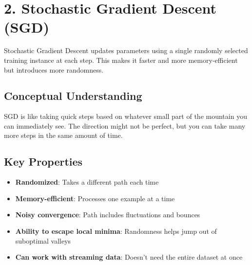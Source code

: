 \documentclass[
  letterpaper,
  DIV=11,
  numbers=noendperiod]{scrreprt}
\providecommand{\tightlist}{%
  \setlength{\itemsep}{0pt}\setlength{\parskip}{0pt}}\usepackage{longtable,booktabs,array}
\begin{document}
\section{2. Stochastic Gradient Descent
(SGD)}\label{stochastic-gradient-descent-sgd}

Stochastic Gradient Descent updates parameters using a single randomly
selected training instance at each step. This makes it faster and more
memory-efficient but introduces more randomness.

\subsection{Conceptual Understanding}\label{conceptual-understanding-2}

SGD is like taking quick steps based on whatever small part of the
mountain you can immediately see. The direction might not be perfect,
but you can take many more steps in the same amount of time.

\subsection{Key Properties}\label{key-properties-1}

\begin{itemize}
\tightlist
\item
  \textbf{Randomized}: Takes a different path each time
\item
  \textbf{Memory-efficient}: Processes one example at a time
\item
  \textbf{Noisy convergence}: Path includes fluctuations and bounces
\item
  \textbf{Ability to escape local minima}: Randomness helps jump out of
  suboptimal valleys
\item
  \textbf{Can work with streaming data}: Doesn't need the entire dataset
  at once
\end{itemize}
\end{document}
